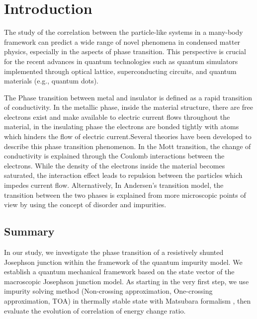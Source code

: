 \documentclass{article}[12pt]
\numberwithin{equation}{section}
\begin{document}
\section{Introduction}
\begin{spacing}{1.5}

The study of the correlation between the particle-like systems in a many-body framework can predict a wide range of novel phenomena in condensed matter physics, especially in the aspects of phase transition. 
This perspective is crucial for the recent advances in quantum technologies such as quantum simulators implemented through optical lattice, superconducting circuits, and quantum materials (e.g., quantum dots).

The Phase transition between metal and insulator is defined as a rapid transition of conductivity. In the metallic phase, inside the material structure, there are free electrons exist and make available to electric current flows throughout the material, in the insulating phase the electrons are bonded tightly with atoms which hinders the flow of electric current.Several theories have been developed to describe this phase transition phenomenon. In the Mott transition, the change of conductivity is explained through the Coulomb interactions between the electrons. While the density of the electrons inside the material becomes saturated, the interaction effect leads to repulsion between the particles which impedes current flow. Alternatively, In Andersen's transition model, the transition between the two phases is explained from more microscopic points of view by using the concept of disorder and impurities.

\subsection{Summary}
In our study, we investigate the phase transition of a resistively shunted Josephson junction within the framework of the quantum impurity model. 
We establish a quantum mechanical framework based on the state vector of the macroscopic Josephson junction model. 
As starting in the very first step, we use impurity solving method (Non-crossing approximation, One-crossing approximation, TOA) in thermally stable state with Matsubara formalism , then evaluate the evolution of correlation of energy change ratio.


\end{spacing}
\end{document}
